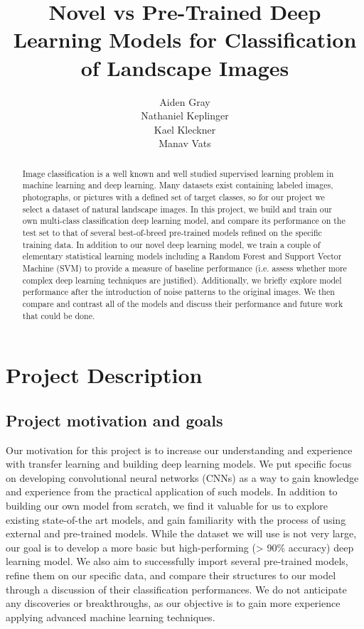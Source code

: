 \documentclass{article}
\title{Novel vs Pre-Trained Deep Learning Models for Classification of Landscape Images
}
\author{%
Aiden Gray\\
\And
Nathaniel Keplinger \\
\And
Kael Kleckner \\
\And
Manav Vats \\
  }
\begin{document}
\maketitle

\begin{abstract}
    Image classification is a well known and well studied supervised learning problem in machine learning and deep learning. Many datasets exist containing labeled images, photographs, or pictures with a defined set of target classes, so for our project we select a dataset of natural landscape images. In this project, we build and train our own multi-class classification deep learning model, and compare its performance on the test set to that of several best-of-breed pre-trained models refined on the specific training data. In addition to our novel deep learning model, we train a couple of elementary statistical learning models including a Random Forest and Support Vector Machine (SVM) to provide a measure of baseline performance (i.e. assess whether more complex deep learning techniques are justified). Additionally, we briefly explore model performance after the introduction of noise patterns to the original images. We then compare and contrast all of the models and discuss their performance and future work that could be done.
\end{abstract}

\section{Project Description}
\subsection{Project motivation and goals}
Our motivation for this project is to increase our understanding and experience with transfer learning and building deep learning models. We put specific focus on developing convolutional neural networks (CNNs) as a way to gain knowledge and experience from the practical application of such models. In addition to building our own model from scratch, we find it valuable for us to explore existing state-of-the art models, and gain familiarity with the process of using external and pre-trained models. While the dataset we will use is not very large, our goal is to develop a more basic but high-performing (> 90\% accuracy) deep learning model. We also aim to successfully import several pre-trained models, refine them on our specific data, and compare their structures to our model through a discussion of their classification performances. We do not anticipate any discoveries or breakthroughs, as our objective is to gain more experience applying advanced machine learning techniques.
\end{document}
